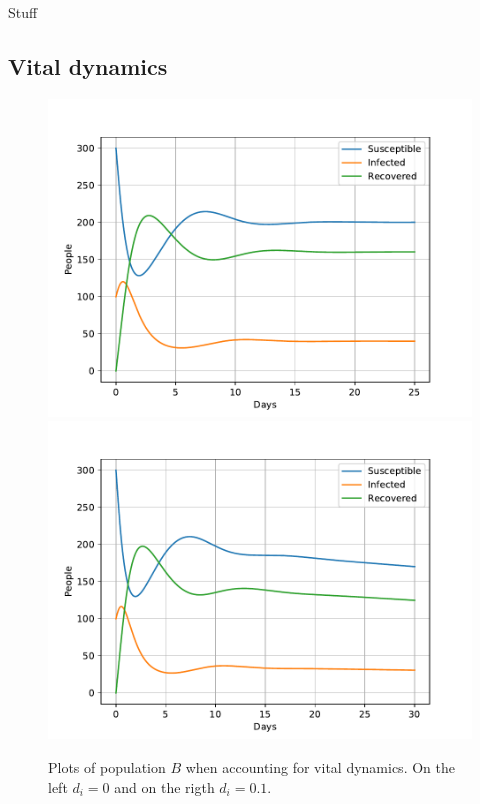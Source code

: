 \documentclass[a4paper]{article}
\let\Oldsubsection\subsection
\renewcommand{\subsection}{\FloatBarrier\Oldsubsection}
\begin{document}
Stuff

\subsection{Vital dynamics}

\begin{figure}[!htb]
	\includegraphics[scale=0.56]{../plots/opp_c_B0.pdf}
	\includegraphics[scale=0.56]{../plots/opp_c_B1.pdf}
	\caption{Plots of population $B$ when accounting for vital dynamics. On the left $d_i=0$ and on the rigth $d_i=0.1$.}
	\label{opp_c0B}
\end{figure}	
\end{document}
